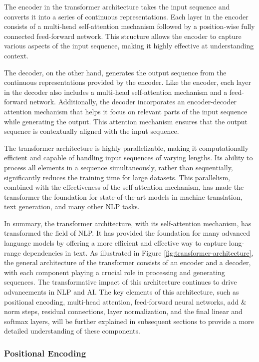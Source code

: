The encoder in the transformer architecture takes the input sequence and converts it into a series of continuous representations. Each layer in the encoder consists of a multi-head self-attention mechanism followed by a position-wise fully connected feed-forward network. This structure allows the encoder to capture various aspects of the input sequence, making it highly effective at understanding context.

The decoder, on the other hand, generates the output sequence from the continuous representations provided by the encoder. Like the encoder, each layer in the decoder also includes a multi-head self-attention mechanism and a feed-forward network. Additionally, the decoder incorporates an encoder-decoder attention mechanism that helps it focus on relevant parts of the input sequence while generating the output. This attention mechanism ensures that the output sequence is contextually aligned with the input sequence.

The transformer architecture is highly parallelizable, making it computationally efficient and capable of handling input sequences of varying lengths. Its ability to process all elements in a sequence simultaneously, rather than sequentially, significantly reduces the training time for large datasets. This parallelism, combined with the effectiveness of the self-attention mechanism, has made the transformer the foundation for state-of-the-art models in machine translation, text generation, and many other NLP tasks.

In summary, the transformer architecture, with its self-attention mechanism, has transformed the field of NLP. It has provided the foundation for many advanced language models by offering a more efficient and effective way to capture long-range dependencies in text. As illustrated in Figure \ref{fig:transformer-architecture}, the general architecture of the transformer consists of an encoder and a decoder, with each component playing a crucial role in processing and generating sequences. The transformative impact of this architecture continues to drive advancements in NLP and AI. The key elements of this architecture, such as positional encoding, multi-head attention, feed-forward neural networks, add \& norm steps, residual connections, layer normalization, and the final linear and softmax layers, will be further explained in subsequent sections to provide a more detailed understanding of these components.

\subsubsection{Positional Encoding}

